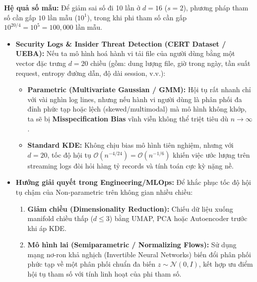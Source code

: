 \begin{ghichu}
\textbf{Hệ quả số mẫu:} Để giảm sai số đi 10 lần ở $d=16$ ($s=2$), phương pháp tham số cần gấp $10$ lần mẫu ($10^{1}$), trong khi phi tham số cần gấp $10^{20/4}=10^{5}=100{,}000$ lần mẫu.
\end{ghichu}

\begin{itemize}
\item \textbf{Security Logs \& Insider Threat Detection (CERT Dataset / UEBA):} Nếu ta mô hình hoá hành vi tải file của người dùng bằng một vector đặc trưng $d=20$ chiều (gồm: dung lượng file, giờ trong ngày, tần suất request, entropy đường dẫn, độ dài session, v.v.):
  \begin{itemize}
  \item \textbf{Parametric (Multivariate Gaussian / GMM):} Hội tụ rất nhanh chỉ với vài nghìn log lines, nhưng nếu hành vi người dùng là phân phối đa đỉnh phức tạp hoặc lệch (skewed/multimodal) mà mô hình không khớp, ta sẽ bị \textbf{Misspecification Bias} vĩnh viễn không thể triệt tiêu dù $n\to\infty$.
  \item \textbf{Standard KDE:} Không chịu bias mô hình tiên nghiệm, nhưng với $d=20$, tốc độ hội tụ $\mathcal{O}(n^{-4/24})=\mathcal{O}(n^{-1/6})$ khiến việc ước lượng trên streaming logs đòi hỏi hàng tỷ records và tính toán cực kỳ nặng nề.
  \end{itemize}
\item \textbf{Hướng giải quyết trong Engineering/MLOps:} Để khắc phục tốc độ hội tụ chậm của Non-parametric trên không gian nhiều chiều:
  \begin{enumerate}
  \item \textbf{Giảm chiều (Dimensionality Reduction):} Chiếu dữ liệu xuống manifold chiều thấp ($d\le 3$) bằng UMAP, PCA hoặc Autoencoder trước khi áp KDE.
  \item \textbf{Mô hình lai (Semiparametric / Normalizing Flows):} Sử dụng mạng nơ-ron khả nghịch (Invertible Neural Networks) biến đổi phân phối phức tạp về một phân phối chuẩn đa biến $z\sim\mathcal{N}(0,I)$, kết hợp ưu điểm hội tụ tham số với tính linh hoạt của phi tham số.
  \end{enumerate}
\end{itemize}


